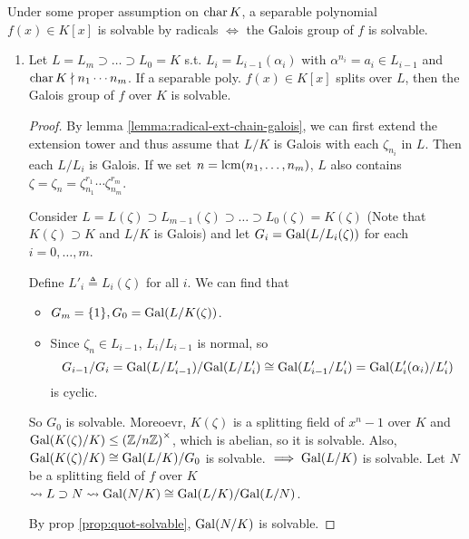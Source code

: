 \begin{theorem} \label{thm:solvable-iff-solvable}
  Under some proper assumption on $\operatorname{char} K$, a separable polynomial $f(x) \in K[x]$
  is solvable by radicals $\iff$ the Galois group of $f$ is solvable.

  \begin{enumerate}[label={\bf Part \Alph*:}]
    \item Let $L = L_m \supset \dots \supset L_0 = K$ s.t. $L_i = L_{i-1}(\alpha_i)$
      with $\alpha^{n_i} = a_i \in L_{i-1}$ and $\operatorname{char} K \nmid n_1\cdots n_m$.
      If a separable poly. $f(x) \in K[x]$ splits over $L$, then the Galois group
      of $f$ over $K$ is solvable.

  \begin{proof}
    By lemma \ref{lemma:radical-ext-chain-galois}, we can first extend
    the extension tower and thus assume that $L/K$ is
    Galois with each $\zeta_{n_i}$ in $L$. Then each $L/L_i$ is Galois.
    If we set $n = \operatorname{lcm}(n_1, \dots, n_m)$,
    $L$ also contains $\zeta = \zeta_n = \zeta_{n_1}^{r_1} \cdots \zeta_{n_m}^{r_m}$.

    Consider $L = L(\zeta) \supset L_{m-1}(\zeta) \supset \dots \supset
    L_0(\zeta) = K(\zeta)$ (Note that $K(\zeta) \supset K$ and $L/K$ is Galois)
    and let $G_i = \operatorname{Gal}(L/L_i(\zeta))$ for each $i = 0, \dots, m$.

    Define $L'_i \triangleq L_i(\zeta)$ for all $i$. We can find that
    \begin{itemize}
      \item $G_m = \{1\}, G_0 = \operatorname{Gal}(L/K(\zeta))$.
      \item Since $\zeta_n \in L_{i-1}$, $L_i / L_{i-1}$ is normal,
        so
        \[ {G_{i-1}}/{G_i} = {\operatorname{Gal}(L/L'_{i-1})}/{\operatorname{Gal}(L/L'_i)}
        \cong \operatorname{Gal}(L'_{i-1} / L'_i) =  \operatorname{Gal}(L'_i(\alpha_i) / L'_i) \] is cyclic.
    \end{itemize}
    So $G_0$ is solvable.
    Moreoevr, $K(\zeta)$ is a splitting field of $x^n - 1$ over $K$ and
    $\operatorname{Gal}(K(\zeta)/K) \le \left({\mathbb{Z}}/{n\mathbb{Z}}\right)^\times$, which is
    abelian, so it is solvable. Also, $\operatorname{Gal}(K(\zeta)/K) \cong {\operatorname{Gal}(L/K)}/{G_0}$
    is solvable. $\implies \operatorname{Gal}(L/K)$ is solvable.
    Let $N$ be a splitting field of $f$ over $K$ $\leadsto L \supset N \leadsto
    \operatorname{Gal}(N/K) \cong {\operatorname{Gal}(L/K)}/{\operatorname{Gal}(L/N)}$.

    By prop \ref{prop:quot-solvable}, $\operatorname{Gal}(N/K)$ is solvable.
  \end{proof}


\end{enumerate}
\end{theorem}
